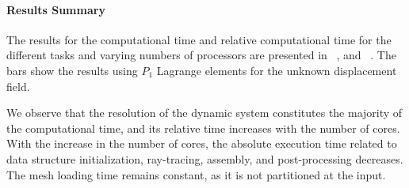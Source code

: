 \paragraph{Results Summary}

The results for the computational time and relative computational time for the
different tasks and varying numbers of processors are presented in ~,
and ~. The bars show the results using $P_1$ Lagrange
elements for the unknown displacement field.


We observe that the resolution of the dynamic system constitutes the majority of
the computational time, and its relative time increases with the number of cores.
With the increase in the number of cores, the absolute execution time related to
data structure initialization, ray-tracing, assembly, and post-processing decreases.
The mesh loading time remains constant, as it is not partitioned at the input.


\dataContact

